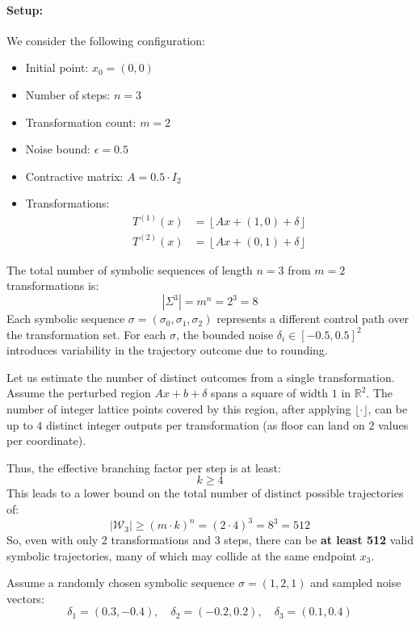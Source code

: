 \documentclass[twocolumn,10pt]{article}
\begin{document}
\paragraph{Setup:}
We consider the following configuration:
\begin{itemize}
  \item Initial point: $x_0 = (0, 0)$
  \item Number of steps: $n = 3$
  \item Transformation count: $m = 2$
  \item Noise bound: $\epsilon = 0.5$
  \item Contractive matrix: $A = 0.5 \cdot I_2$
  \item Transformations:
  \begin{align*}
    T^{(1)}(x) &= \left\lfloor A x + (1, 0) + \delta \right\rfloor \\
    T^{(2)}(x) &= \left\lfloor A x + (0, 1) + \delta \right\rfloor
  \end{align*}
\end{itemize}

The total number of symbolic sequences of length $n=3$ from $m=2$ transformations is:
\[
|\Sigma^3| = m^n = 2^3 = 8
\]
Each symbolic sequence $\sigma = (\sigma_0, \sigma_1, \sigma_2)$ represents a different control path over the transformation set. For each $\sigma$, the bounded noise $\delta_i \in [-0.5, 0.5]^2$ introduces variability in the trajectory outcome due to rounding.

Let us estimate the number of distinct outcomes from a single transformation. Assume the perturbed region $Ax + b + \delta$ spans a square of width $1$ in $\mathbb{R}^2$. The number of integer lattice points covered by this region, after applying $\lfloor \cdot \rfloor$, can be up to $4$ distinct integer outputs per transformation (as floor can land on 2 values per coordinate).

Thus, the effective branching factor per step is at least:
\[
k \geq 4
\]
This leads to a lower bound on the total number of distinct possible trajectories of:
\[
|\mathcal{W}_3| \geq (m \cdot k)^n = (2 \cdot 4)^3 = 8^3 = 512
\]
So, even with only 2 transformations and 3 steps, there can be \textbf{at least 512} valid symbolic trajectories, many of which may collide at the same endpoint $x_3$.

Assume a randomly chosen symbolic sequence $\sigma = (1, 2, 1)$ and sampled noise vectors:
\[
\delta_1 = (0.3, -0.4), \quad \delta_2 = (-0.2, 0.2), \quad \delta_3 = (0.1, 0.4)
\]
\end{document}
